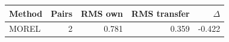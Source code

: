 \begin{tabular}{lrrrr}
\hline
Method & Pairs & RMS own & RMS transfer & $\Delta$ \\
\hline
MOREL & 2 & 0.781 & 0.359 & -0.422 \\
\hline
\end{tabular}
